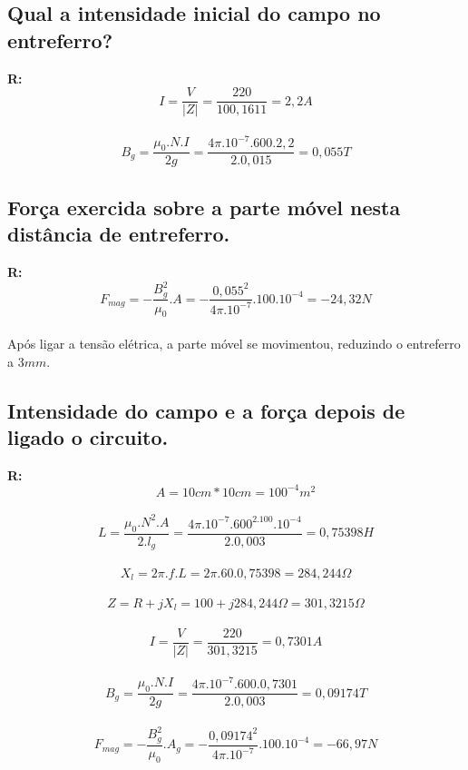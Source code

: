 \documentclass{article}
\begin{document}
\subsection{Qual a intensidade inicial do campo no entreferro?}
\textbf{R:}
\[I=\frac{V}{|Z|} = \frac{220}{100,1611} = 2,2A\]\
\[B_{g}=\frac{\mu_{0}.N.I}{2g} = \frac{4\pi.10^{-7}.600.2,2}{2.0,015} = 0,055T\]

\subsection{Força exercida sobre a parte móvel nesta distância de entreferro.}
\textbf{R:}
\[F_{mag} = -\frac{B_{g}^{2}}{\mu_{0}}.A = -\frac{0,055^2}{4\pi.10^{-7}}.100.10^{-4} = - 24,32N\]\\
Após ligar a tensão elétrica, a parte móvel se movimentou, reduzindo o entreferro a \(3mm\).
\subsection{Intensidade do campo e a força depois de ligado o circuito.}
\textbf{R:}
\[A=10cm*10cm = 100^{-4}m^2\]\
\[L=\frac{\mu_{0}.N^2.A}{2.l_g} = \frac{4\pi.10^{-7}.600^2.100.10^{-4}}{2.0,003} = 0,75398H\]\
\[X_l=2\pi.f.L = 2\pi.60.0,75398 = 284,244\Omega\]\
\[Z = R + jX_l = 100 + j284,244\Omega = 301,3215\Omega\]\
\[I=\frac{V}{|Z|} = \frac{220}{301,3215} = 0,7301A\]\
\[B_{g}=\frac{\mu_{0}.N.I}{2g} = \frac{4\pi.10^{-7}.600.0,7301}{2.0,003} = 0,09174T\]\
\[F_{mag} = -\frac{B_{g}^{2}}{\mu_{0}}.A_{g} = -\frac{0,09174^2}{4\pi.10^{-7}}.100.10^{-4} = -66,97N \]
\end{document}
